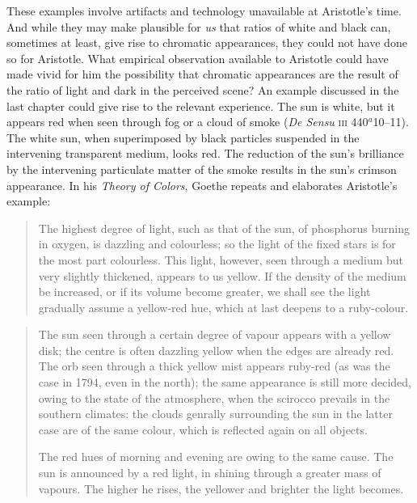 
These examples involve artifacts and technology unavailable at Aristotle's time. And while they may make plausible for \emph{us} that ratios of white and black can, sometimes at least, give rise to chromatic appearances, they could not have done so for Aristotle. What empirical observation available to Aristotle could have made vivid for him the possibility that chromatic appearances are the result of the ratio of light and dark in the perceived scene? An example discussed in the last chapter could give rise to the relevant experience. The sun is white, but it appears red when seen through fog or a cloud of smoke (\emph{De Sensu} \textsc{iii} 440\( ^{a} \)10--11).  The white sun, when superimposed by black particles suspended in the intervening transparent medium, looks red. The reduction of the sun's brilliance by the intervening particulate matter of the smoke results in the sun's crimson appearance. In his \emph{Theory of Colors}, Goethe repeats and elaborates Aristotle's example:
\begin{quote}
	The highest degree of light, such as that of the sun, of phosphorus burning in oxygen, is dazzling and colourless; so the light of the fixed stars is for the most part colourless. This light, however, seen through a medium but very slightly thickened, appears to us yellow. If the density of the medium be increased, or if its volume become greater, we shall see the light gradually assume a yellow-red hue, which at last deepens to a ruby-colour. \citep[\textsc{i}.10 150]{Goethe:1810uq}
\end{quote}
\begin{quotation}
	\noindent The sun seen through a certain degree of vapour appears with a yellow disk; the centre is often dazzling yellow when the edges are already red. The orb seen through a thick yellow mist appears ruby-red (as was the case in 1794, even in the north); the same appearance is still more decided, owing to the state of the atmosphere, when the scirocco prevails in the southern climates: the clouds genrally surrounding the sun in the latter case are of the same colour, which is reflected again on all objects.
	
	The red hues of morning and evening are owing to the same cause. The sun is announced by a red light, in shining through a greater mass of vapours. The higher he rises, the yellower and brighter the light becomes. \citep[\textsc{i}.10 154]{Goethe:1810uq}
\end{quotation}

